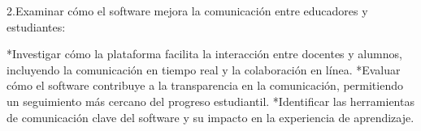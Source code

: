 2.Examinar cómo el software mejora la comunicación entre educadores y estudiantes:

*Investigar cómo la plataforma facilita la interacción entre docentes y alumnos, incluyendo la comunicación en tiempo real y la colaboración en línea.
*Evaluar cómo el software contribuye a la transparencia en la comunicación, permitiendo un seguimiento más cercano del progreso estudiantil.
*Identificar las herramientas de comunicación clave del software y su impacto en la experiencia de aprendizaje.
